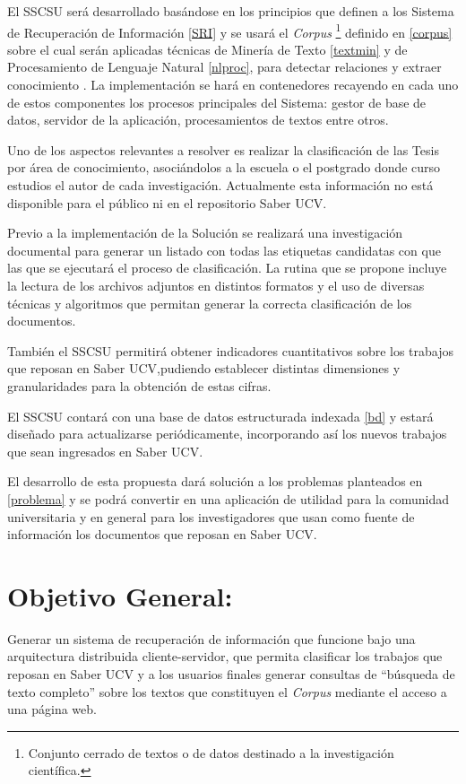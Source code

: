\documentclass[
  10,
  openany]{book}
\begin{document}
El SSCSU será desarrollado basándose en los principios que definen a los Sistema de Recuperación de Información \ref{SRI} y se usará el \emph{Corpus} \footnote{Conjunto cerrado de textos o de datos destinado a la investigación científica.} definido en \ref{corpus} sobre el cual serán aplicadas técnicas de Minería de Texto \ref{textmin} y de Procesamiento de Lenguaje Natural \ref{nlproc}, para detectar relaciones y extraer conocimiento \citep{miningt2012c}. La implementación se hará en contenedores recayendo en cada uno de estos componentes los procesos principales del Sistema: gestor de base de datos, servidor de la aplicación, procesamientos de textos entre otros.

Uno de los aspectos relevantes a resolver es realizar la clasificación de las Tesis por área de conocimiento, asociándolos a la escuela o el postgrado donde curso estudios el autor de cada investigación. Actualmente esta información no está disponible para el público ni en el repositorio Saber UCV.

Previo a la implementación de la Solución se realizará una investigación documental para generar un listado con todas las etiquetas candidatas con que las que se ejecutará el proceso de clasificación. La rutina que se propone incluye la lectura de los archivos adjuntos en distintos formatos y el uso de diversas técnicas y algoritmos que permitan generar la correcta clasificación de los documentos.

También el SSCSU permitirá obtener indicadores cuantitativos sobre los trabajos que reposan en Saber UCV,pudiendo establecer distintas dimensiones y granularidades para la obtención de estas cifras.

El SSCSU contará con una base de datos estructurada indexada \ref{bd} y estará diseñado para actualizarse periódicamente, incorporando así los nuevos trabajos que sean ingresados en Saber UCV.

El desarrollo de esta propuesta dará solución a los problemas planteados en \ref{problema} y se podrá convertir en una aplicación de utilidad para la comunidad universitaria y en general para los investigadores que usan como fuente de información los documentos que reposan en Saber UCV.

\hypertarget{objetivo}{%
\section{Objetivo General:}\label{objetivo}}

Generar un sistema de recuperación de información que funcione bajo una arquitectura distribuida cliente-servidor, que permita clasificar los trabajos que reposan en Saber UCV y a los usuarios finales generar consultas de ``búsqueda de texto completo'' sobre los textos que constituyen el \emph{Corpus} mediante el acceso a una página web.
\end{document}
